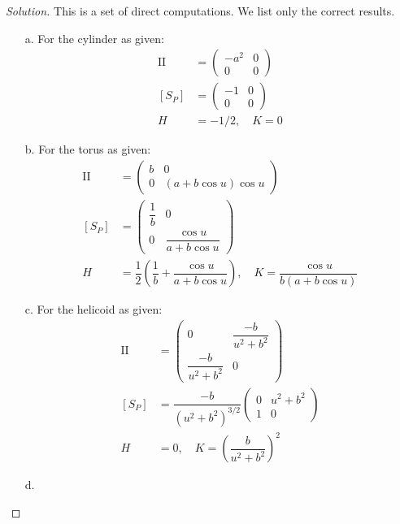\documentclass[Shifrin_Solutions_Spring_2015]{subfiles}
\begin{document}
\begin{proof}[Solution] This is a set of direct computations. We list only the correct results.
\begin{itemize}
\item[a.] For the cylinder as given:
\begin{align*}
\mathrm{II} & = \begin{pmatrix} -a^2 & 0 \\ 0 & 0 \end{pmatrix} \\
\left[S_P\right] & = \begin{pmatrix} -1 & 0 \\ 0 & 0 \end{pmatrix} \\
H & = -1/2, \quad K = 0
\end{align*}

\item[b.] For the torus as given:
\begin{align*}
\mathrm{II} & = \begin{pmatrix} b & 0 \\ 0 & (a+b\cos u) \cos u \end{pmatrix} \\
\left[S_P\right] & = \begin{pmatrix} \dfrac{1}{b} & 0 \\ 0 & \dfrac{\cos u}{a+b\cos u} \end{pmatrix} \\
H & = \dfrac{1}{2}\left( \dfrac{1}{b} + \dfrac{\cos u}{a+b\cos u}\right), \quad K = \dfrac{\cos u}{b(a+b\cos u)}
\end{align*}

\item[c.] For the helicoid as given:
\begin{align*}
\mathrm{II} & = \begin{pmatrix} 0 & \dfrac{-b}{u^2+b^2} \\ \dfrac{-b}{u^2+b^2} & 0  \end{pmatrix} \\
\left[S_P\right] & =\dfrac{-b}{(u^2+b^2)^{3/2}} \begin{pmatrix}  0 & u^2+b^2 \\ 1 & 0 \end{pmatrix} \\
H & = 0, \quad K = \left( \dfrac{b}{u^2+b^2} \right)^2
\end{align*}

\item[d.]


\end{itemize}
\end{proof}
\end{document}
